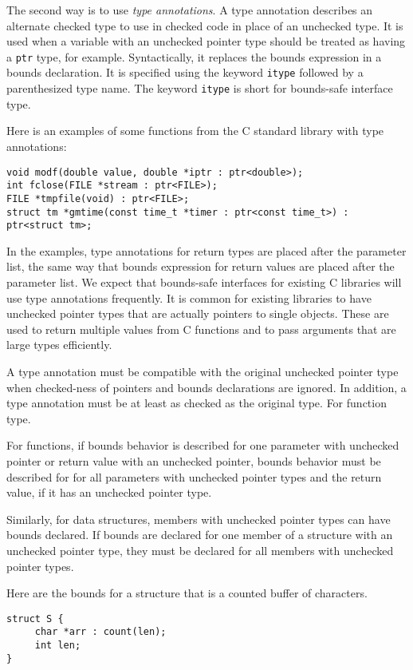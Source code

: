 The second way is to use {\em type annotations}.  A type annotation
describes an alternate checked type to use in checked code
in place of an unchecked type.  It is used when a variable with
an unchecked pointer type should be treated as having
a \texttt{ptr} type, for example.  Syntactically, it replaces
the bounds expression in a bounds declaration.   It is specified
using the keyword \texttt{itype} followed by a parenthesized
type name.   The keyword \texttt{itype} is short for bounds-safe
interface type.

Here is an examples of some functions from the C standard
library with type annotations:
\begin{verbatim}
void modf(double value, double *iptr : ptr<double>);
int fclose(FILE *stream : ptr<FILE>);
FILE *tmpfile(void) : ptr<FILE>;
struct tm *gmtime(const time_t *timer : ptr<const time_t>) : ptr<struct tm>;
\end{verbatim}
In the examples, type annotations for return types are placed 
after the parameter list, the same way that bounds expression for
return values are placed after the parameter list.
We expect that bounds-safe interfaces for existing C
libraries will use type annotations frequently.   It is common for
existing libraries to have unchecked pointer types that are actually 
pointers to single objects.  These are used to return multiple values from
C functions and to pass arguments that are large  types
efficiently.

A type annotation must be compatible with the original unchecked
pointer type when checked-ness of pointers and bounds declarations
are ignored.  In addition, a type annotation must be at least as
checked as the original type.  For function type.

For functions, if bounds behavior is described for one parameter with
unchecked pointer or return value with an unchecked pointer,
bounds behavior must be described for for all parameters with unchecked
pointer types and the return value, if it has an unchecked pointer type.

Similarly, for data structures, members with unchecked pointer types can
have bounds declared. If bounds are declared for one member of a
structure with an unchecked pointer type, they must be declared for all
members with unchecked pointer types.

Here are the bounds for a structure that is a counted buffer of
characters.
\begin{verbatim}
struct S {
     char *arr : count(len);
     int len;
}
\end{verbatim}

